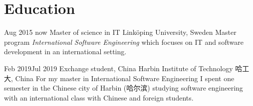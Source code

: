 \documentclass[]{k-cv} %
\begin{document}
\section{Education}

\begin{entrylist}
\entry
{Aug 2015 \newline\to now}
{Master of science in IT}
{Linköping University, Sweden}
{\small Master program \emph{International Software Engineering} which focuses on IT and software development in an international setting.}

\entry
{Feb 2019\newline\to Jul 2019}
{Exchange student, China}
{Harbin Institute of Technology 哈工大, China}
{\small For my master in International Software Engineering I spent one semester in the
Chinese city of Harbin (哈尔滨) studying software engineering with an
international class with Chinese and foreign students.}
\end{entrylist}
\end{document}
